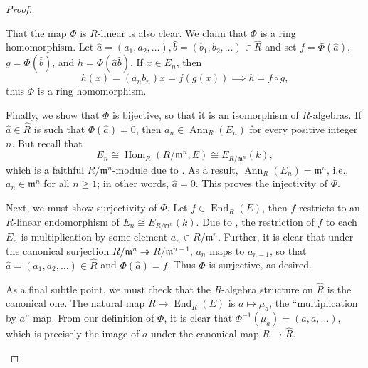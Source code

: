 \documentclass[10pt]{article}
\theoremstyle{thmstyle}
\theoremstyle{defstyle}
\newcommand{\Ann}{\operatorname{Ann}}
\newcommand{\Hom}{\operatorname{Hom}}
\newcommand{\End}{\operatorname{End}}
\newcommand{\frakm}{\mathfrak{m}} %
\newcommand{\wh}[1]{\widehat{#1}}
\newcommand{\onto}{\twoheadrightarrow}
\renewcommand{\ge}{\geqslant}
\begin{document}
\begin{proof}
\begin{enumerate}[label=(\arabic*)]
    That the map $\Phi$ is $R$-linear is also clear. We claim that $\Phi$ is a ring homomorphism. Let $\wh a = (a_1,a_2,\dots), \wh b = (b_1,b_2,\dots)\in\wh R$ and set $f = \Phi(\wh a)$, $g = \Phi(\wh b)$, and $h = \Phi(\wh a\wh b)$. If $x\in E_n$, then
    \begin{equation*}
        h(x) = (a_nb_n)x = f(g(x))\implies h = f\circ g,
    \end{equation*}
    thus $\Phi$ is a ring homomorphism.

    Finally, we show that $\Phi$ is bijective, so that it is an isomorphism of $R$-algebras. If $\wh a\in\wh R$ is such that $\Phi(\wh a) = 0$, then $a_n\in\Ann_R(E_n)$ for every positive integer $n$. But recall that 
    \begin{equation*}
        E_n\cong\Hom_{R}\left(R/\frakm^n, E\right)\cong E_{R/\frakm^n}(k),
    \end{equation*}
    which is a faithful $R/\frakm^n$-module due to . As a result, $\Ann_R(E_n) = \frakm^n$, i.e., $a_n\in\frakm^n$ for all $n\ge 1$; in other words, $\wh a = 0$. This proves the injectivity of $\Phi$. 

    Next, we must show surjectivity of $\Phi$. Let $f\in\End_R(E)$, then $f$ restricts to an $R$-linear endomorphism of $E_n\cong E_{R/\frakm^n}(k)$. Due to , the restriction of $f$ to each $E_n$ is multiplication by some element $a_n\in R/\frakm^n$. Further, it is clear that under the canonical surjection $R/\frakm^n\onto R/\frakm^{n - 1}$, $a_n$ maps to $a_{n - 1}$, so that $\wh a = (a_1,a_2,\dots)\in\wh R$ and $\Phi(\wh a) = f$. Thus $\Phi$ is surjective, as desired.

    As a final subtle point, we must check that the $R$-algebra structure on $\wh R$ is the canonical one. The natural map $R\to\End_R(E)$ is $a\mapsto\mu_a$, the ``multiplication by $a$'' map. From our definition of $\Phi$, it is clear that $\Phi^{-1}(\mu_a) = (a, a, \dots)$, which is precisely the image of $a$ under the canonical map $R\to\wh R$.


\end{enumerate}
\end{proof}
\end{document}
